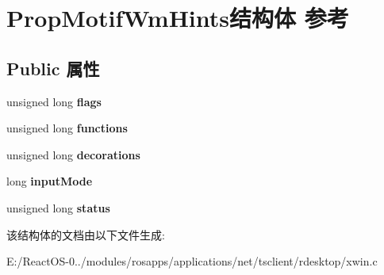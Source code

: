 \hypertarget{struct_prop_motif_wm_hints}{}\section{Prop\+Motif\+Wm\+Hints结构体 参考}
\label{struct_prop_motif_wm_hints}
\subsection*{Public 属性}
\begin{DoxyCompactItemize}
\item 
\mbox{\label{struct_prop_motif_wm_hints_a1157b0d0411397a77cbc0211517f2f87}} 
unsigned long {\bfseries flags}
\item 
\mbox{\label{struct_prop_motif_wm_hints_aafaeedc7df42043fd0b5960c0c6298a7}} 
unsigned long {\bfseries functions}
\item 
\mbox{\label{struct_prop_motif_wm_hints_a8bc53f1ad37d7593106913a7ac06b575}} 
unsigned long {\bfseries decorations}
\item 
\mbox{\label{struct_prop_motif_wm_hints_afe2cdcae1e60d83d666653199e5ea2b2}} 
long {\bfseries input\+Mode}
\item 
\mbox{\label{struct_prop_motif_wm_hints_a3ae9c36f83da85dee24e2c768ad10ea6}} 
unsigned long {\bfseries status}
\end{DoxyCompactItemize}


该结构体的文档由以下文件生成\+:\begin{DoxyCompactItemize}
\item 
E\+:/\+React\+O\+S-\/0../modules/rosapps/applications/net/tsclient/rdesktop/xwin.\+c\end{DoxyCompactItemize}
